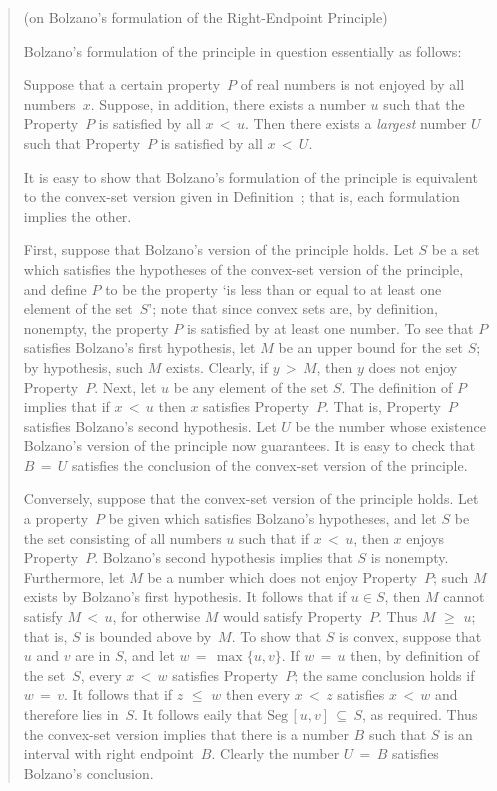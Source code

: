 \begin{quotation}
{\footnotesize \underline{\Note} (on Bolzano's formulation of the Right-Endpoint Principle)


    Bolzano's formulation of the principle in question essentially as follows:

\V

        Suppose that a certain property~$P$ of real numbers is not enjoyed by all numbers~$x$.
    Suppose, in addition, there exists a number $u$ such that the Property~$P$ is satisfied by all $x\,<\,u$.
    Then there exists a {\em largest} number $U$ such that Property~$P$ is satisfied by all $x\,<\,U$.

\V

        It is easy to show that Bolzano's formulation of the principle is equivalent to the convex-set version given in Definition~;
    that is, each formulation implies the other.

        First, suppose that Bolzano's version of the principle holds. Let $S$ be a set
    which satisfies the hypotheses of the convex-set version of the principle, and define $P$ to be the property
    `is less than or equal to at least one element of the set~$S$'; note that since convex sets are, by definition, nonempty,
    the property $P$ is satisfied by at least one number. To see that $P$ satisfies Bolzano's first hypothesis, let $M$ be an upper bound for the set $S$; 
    by hypothesis, such $M$ exists. Clearly, if $y\,>\,M$, then $y$ does not enjoy Property~$P$.
    Next, let $u$ be any element of the set $S$. The definition of $P$ implies that if $x\,<\,u$ then $x$ satisfies Property~$P$.
    That is, Property~$P$ satisfies Bolzano's second hypothesis.
    Let $U$ be the number whose existence Bolzano's version of the principle now guarantees.
    It is easy to check that $B \,=\, U$ satisfies the conclusion of the convex-set version of the principle.
 
        Conversely, suppose that the convex-set version of the principle holds. Let a property~$P$ be given which satisfies Bolzano's hypotheses,
    and let $S$ be the set consisting of all numbers $u$ such that if $x\,<\,u$, then $x$ enjoys Property~$P$.
    Bolzano's second hypothesis implies that $S$ is nonempty. Furthermore, let $M$ be a number which does not enjoy Property~$P$;
    such $M$ exists by Bolzano's first hypothesis. It follows that if $u{\in}S$, then $M$ cannot satisfy $M\,<\,u$,
    for otherwise $M$ would satisfy Property~$P$. Thus $M\,\,{\geq}\,\,u$; that is, $S$ is bounded above by~$M$.
    To show that $S$ is convex, suppose that $u$ and $v$ are in $S$, and let $w \,=\, \max\{u,v\}$.
    If $w \,=\, u$ then, by definition of the set~$S$, every $x\,<\,w$ satisfies Property~$P$; the same conclusion holds if $w \,=\, v$.
    It follows that if $z\,\,{\leq}\,\,w$ then every $x\,<\,z$ satisfies $x\,<\,w$ and therefore lies in~$S$.
    It follows eaily that $\mbox{Seg}\,[u,v] \,{\subseteq}\, S$, as required. Thus the convex-set version implies that
    there is a number $B$ such that $S$ is an interval with right endpoint~$B$. Clearly the number $U \,=\, B$ satisfies Bolzano's conclusion.

}
\end{quotation}
